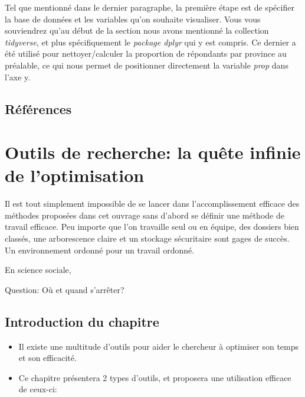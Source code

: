 \documentclass[
  letterpaper,
  DIV=11,
  numbers=noendperiod]{scrreprt}
\begin{document}
Tel que mentionné dans le dernier paragraphe, la première étape est de
spécifier la base de données et les variables qu'on souhaite visualiser.
Vous vous souviendrez qu'au début de la section nous avons mentionné la
collection \emph{tidyverse}, et plus spécifiquement le \emph{package
dplyr} qui y est compris. Ce dernier a été utilisé pour
nettoyer/calculer la proportion de répondants par province au préalable,
ce qui nous permet de positionner directement la variable \emph{prop}
dans l'axe y.

\clearpage

\hypertarget{ruxe9fuxe9rences-1}{%
\section{Références}\label{ruxe9fuxe9rences-1}}


\hypertarget{outils-de-recherche-la-quuxeate-infinie-de-loptimisation}{%
\chapter{Outils de recherche: la quête infinie de
l'optimisation}\label{outils-de-recherche-la-quuxeate-infinie-de-loptimisation}}

Il est tout simplement impossible de se lancer dans l'accomplissement
efficace des méthodes proposées dans cet ouvrage sans d'abord se définir
une méthode de travail efficace. Peu importe que l'on travaille seul ou
en équipe, des dossiers bien classés, une arborescence claire et un
stockage sécuritaire sont gages de succès. Un environnement ordonné pour
un travail ordonné.

En science sociale,

Question: Où et quand s'arrêter?

\hypertarget{introduction-du-chapitre}{%
\section{Introduction du chapitre}\label{introduction-du-chapitre}}

\begin{itemize}
\item
  Il existe une multitude d'outils pour aider le chercheur à optimiser
  son temps et son efficacité.
\item
  Ce chapitre présentera 2 types d'outils, et proposera une utilisation
  efficace de ceux-ci:
\end{itemize}
\end{document}
